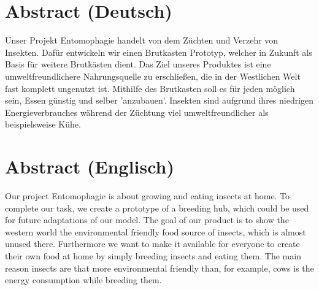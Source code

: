 \chapter*{Abstract (Deutsch)}
Unser Projekt Entomophagie handelt von dem Züchten und Verzehr von Insekten. Dafür entwickeln wir einen Brutkasten Prototyp, welcher in Zukunft als Basis für weitere Brutkästen dient. Das Ziel unseres Produktes ist eine umweltfreundlichere Nahrungsquelle zu erschließen, die in der Westlichen Welt fast komplett ungenutzt ist. Mithilfe des Brutkasten soll es für jeden möglich sein, Essen günstig und selber 'anzubauen'. Insekten sind aufgrund ihres niedrigen Energieverbrauches während der Züchtung viel umweltfreundlicher als beispielsweise Kühe.

\chapter*{Abstract (Englisch)}
Our project Entomophagie is about growing and eating insects at home. To complete our task, we create a prototype of a breeding hub, which could be used for future adaptations of our model. The goal of our product is to show the western world the environmental friendly food source of insects, which is almost unused there. Furthermore we want to make it available for everyone to create their own food at home by simply breeding insects and eating them. The main reason insects are that more environmental friendly than, for example, cows is the energy consumption while breeding them.